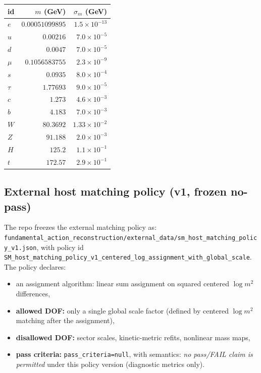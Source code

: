 \documentclass[11pt,a4paper]{article}
\begin{document}
\begin{center}
\begin{tabular}{lrr}
\toprule
id & $m$ (GeV) & $\sigma_m$ (GeV)\\
\midrule
$e$ & $0.00051099895$ & $1.5\times 10^{-13}$\\
$u$ & $0.00216$ & $7.0\times 10^{-5}$\\
$d$ & $0.0047$ & $7.0\times 10^{-5}$\\
$\mu$ & $0.1056583755$ & $2.3\times 10^{-9}$\\
$s$ & $0.0935$ & $8.0\times 10^{-4}$\\
$\tau$ & $1.77693$ & $9.0\times 10^{-5}$\\
$c$ & $1.273$ & $4.6\times 10^{-3}$\\
$b$ & $4.183$ & $7.0\times 10^{-3}$\\
$W$ & $80.3692$ & $1.33\times 10^{-2}$\\
$Z$ & $91.188$ & $2.0\times 10^{-3}$\\
$H$ & $125.2$ & $1.1\times 10^{-1}$\\
$t$ & $172.57$ & $2.9\times 10^{-1}$\\
\bottomrule
\end{tabular}
\end{center}

\subsection{External host matching policy (v1, frozen no-pass)}

The repo freezes the external matching policy as:
\verb|fundamental_action_reconstruction/external_data/sm_host_matching_policy_v1.json|,
with policy id \texttt{SM\_host\_matching\_policy\_v1\_centered\_log\_assignment\_with\_global\_scale}.
The policy declares:
\begin{itemize}
  \item an assignment algorithm: linear sum assignment on squared centered $\log m^2$ differences,
  \item \textbf{allowed DOF:} only a single global scale factor (defined by centered $\log m^2$ matching after the assignment),
  \item \textbf{disallowed DOF:} sector scales, kinetic-metric refits, nonlinear mass maps,
  \item \textbf{pass criteria:} \texttt{pass\_criteria=null}, with semantics: \emph{no pass/FAIL claim is permitted} under this policy version (diagnostic metrics only).
\end{itemize}
\end{document}

